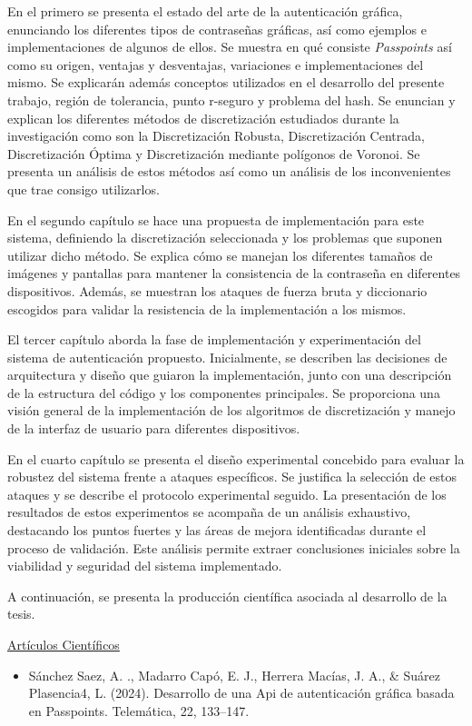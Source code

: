 En el primero se presenta el estado del arte de la autenticación gráfica, enunciando los diferentes tipos de contraseñas gráficas, así como ejemplos e implementaciones de algunos de ellos. Se muestra en qué consiste \textit{Passpoints} así como su origen, ventajas y desventajas, variaciones e implementaciones del mismo. Se explicarán además conceptos utilizados en el desarrollo del presente trabajo, región de tolerancia, punto r-seguro y problema del hash. Se enuncian y explican los diferentes métodos de discretización estudiados durante la investigación como son la Discretización Robusta, Discretización Centrada, Discretización Óptima y Discretización mediante polígonos de Voronoi. Se presenta un análisis de estos métodos así como un análisis de los inconvenientes que trae consigo utilizarlos.


En el segundo capítulo se hace una propuesta de implementación para este sistema, definiendo la discretización seleccionada y los problemas que suponen utilizar dicho método. Se explica cómo se manejan los diferentes tamaños de imágenes y pantallas para mantener la consistencia de la contraseña en diferentes dispositivos. Además, se muestran los ataques de fuerza bruta y diccionario escogidos para validar la resistencia de la implementación a los mismos.

El tercer capítulo aborda la fase de implementación y experimentación del sistema de autenticación propuesto. Inicialmente, se describen las decisiones de arquitectura y dise\~no que guiaron la implementación, junto con una descripción de la estructura del código y los componentes principales. Se proporciona una visión general de la implementación de los algoritmos de discretización y manejo de la interfaz de usuario para diferentes dispositivos. 

En el cuarto cap\'itulo se presenta el diseño experimental concebido para evaluar la robustez del sistema frente a ataques específicos. Se justifica la selección de estos ataques y se describe el protocolo experimental seguido. La presentación de los resultados de estos experimentos se acompaña de un análisis exhaustivo, destacando los puntos fuertes y las áreas de mejora identificadas durante el proceso de validación. Este análisis permite extraer conclusiones iniciales sobre la viabilidad y seguridad del sistema implementado.

A continuaci\'on, se presenta la producci\'on cient\'ifica asociada al desarrollo de la tesis.

\underline{Art\'iculos Cient\'ificos}
\begin{itemize}
	\item Sánchez Saez, A. ., Madarro Capó, E. J., Herrera Macías, J. A., \& Suárez Plasencia4, L. (2024). Desarrollo de una Api de autenticaci\'on gr\'afica basada en Passpoints. Telemática, 22, 133–147.\\
\end{itemize}


